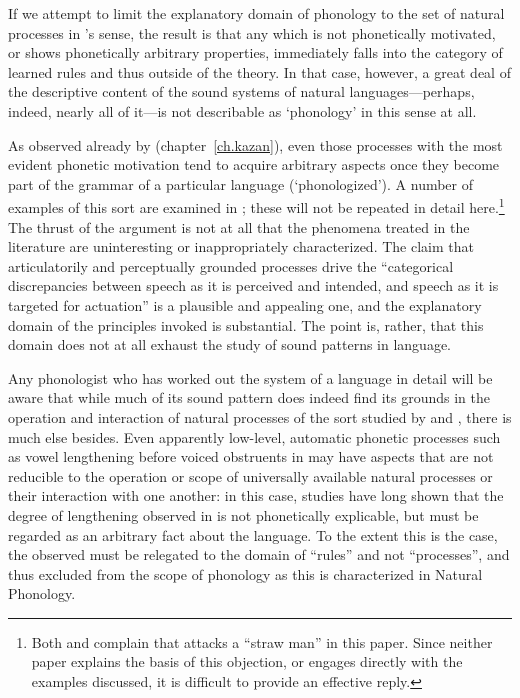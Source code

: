 If we attempt to limit the explanatory domain of phonology to the set
of natural processes in {\Stampe}'s sense, the result is that any
 which is not phonetically motivated, or shows phonetically
arbitrary properties, immediately falls into the category of learned
rules and thus outside of the theory. In that case, however, a great
deal of the descriptive content of the sound systems of natural
languages—perhaps, indeed, nearly all of it—is not describable as
`phonology' in this sense at all.

As observed already by {\DeCourtenay} (chapter~\ref{ch.kazan}),
even those processes with the most evident phonetic motivation tend to
acquire arbitrary aspects once they become part of the grammar of a
particular language (`phonologized'). A number of examples of this
sort are examined in \citealt{sra81:unnatural}; these will not be
repeated in detail here.\footnote{Both
  \citet{dressler84:explaining.np} and
  \citet{donegan.stampe09:hypotheses} complain that
  \citet{sra81:unnatural} attacks a ``straw man'' in this paper. Since
  neither paper explains the basis of this objection, or engages directly
  with the examples discussed, it is difficult to provide an effective
  reply.} The thrust of the argument is not at all that the phenomena
treated in the  literature are uninteresting or
inappropriately characterized. The claim that articulatorily and
perceptually grounded processes drive the ``categorical discrepancies
between speech as it is perceived and intended, and speech as it is
targeted for actuation'' \citep[1]{donegan.stampe09:hypotheses} is a
plausible and appealing one, and the explanatory domain of the
principles invoked is substantial. The point is, rather, that this
domain does not at all exhaust the study of sound patterns in
language.

Any phonologist who has worked out the system of a language in detail
will be aware that while much of its sound pattern does indeed find
its grounds in the operation and interaction of natural processes of
the sort studied by {\Stampe} and {\Donegan}, there is much else
besides. Even apparently low-level, automatic phonetic processes such
as vowel lengthening before voiced obstruents in  may have
aspects that are not reducible to the operation or scope of
universally available natural processes or their interaction with one
another: in this case, studies have long shown that the degree of
lengthening observed in  is not phonetically explicable, but
must be regarded as an arbitrary fact about the language. To the
extent this is the case, the  observed must be relegated
to the domain of ``rules'' and not ``processes'', and thus excluded
from the scope of phonology as this is characterized in Natural
Phonology. 

